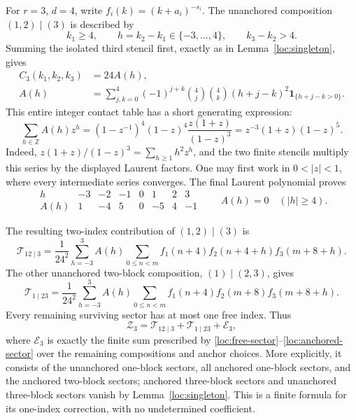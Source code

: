 \documentclass[11pt,a4paper]{article}
\numberwithin{equation}{section}
\theoremstyle{definition}
\theoremstyle{remark}
\newcommand{\Z}{\mathbb Z}
\newcommand{\ind}{\mathbf 1}
\begin{document}
For $r=3$, $d=4$, write $f_i(k)=(k+a_i)^{-s_i}$.  The unanchored
composition $(1,2)\mid(3)$ is described by
\[
 k_1\ge4,\qquad h=k_2-k_1\in\{-3,\ldots,4\},
 \qquad k_3-k_2>4.
\]
Summing the isolated third stencil first, exactly as in
Lemma~\ref{loc:singleton}, gives
\begin{align}
 C_3(k_1,k_2,k_3)&=24A(h),\label{loc:rank3-contact}\\
 A(h)&=\sum_{j,k=0}^4(-1)^{j+k}\binom4j\binom4k
                  (h+j-k)^2\ind_{\{h+j-k>0\}}.
                  \label{loc:rank3-A}
\end{align}
This entire integer contact table has a short generating expression:
\begin{equation}
 \sum_{h\in\Z}A(h)z^h
   =(1-z^{-1})^4(1-z)^4\frac{z(1+z)}{(1-z)^3}
   =z^{-3}(1+z)(1-z)^5.
 \label{loc:rank3-generating}
\end{equation}
Indeed, $z(1+z)/(1-z)^3=\sum_{h\ge1}h^2z^h$, and the two finite
stencils multiply this series by the displayed Laurent factors.
One may first work in $0<|z|<1$, where every intermediate series
converges.  The final Laurent polynomial proves
\[
\begin{array}{c|rrrrrrr}
 h&-3&-2&-1&0&1&2&3\\\hline
 A(h)&1&-4&5&0&-5&4&-1
\end{array}
\qquad A(h)=0\quad(|h|\ge4).
\]

The resulting two-index contribution of $(1,2)\mid(3)$ is
\begin{equation}
 \mathcal T_{12\mid3}
  =\frac1{24^2}\sum_{h=-3}^3 A(h)
       \sum_{0\le n<m}
       f_1(n+4)f_2(n+4+h)f_3(m+8+h).
 \label{loc:rank3-first}
\end{equation}
The other unanchored two-block composition, $(1)\mid(2,3)$, gives
\begin{equation}
 \mathcal T_{1\mid23}
  =\frac1{24^2}\sum_{h=-3}^3 A(h)
       \sum_{0\le n<m}
       f_1(n+4)f_2(m+8)f_3(m+8+h).
 \label{loc:rank3-second}
\end{equation}
Every remaining surviving sector has at most one free index.  Thus
\begin{equation}
 \mathcal Z_3=\mathcal T_{12\mid3}+\mathcal T_{1\mid23}
                         +\mathcal E_3,
 \label{loc:rank3-decomposition}
\end{equation}
where $\mathcal E_3$ is exactly the finite sum prescribed by
\eqref{loc:free-sector}--\eqref{loc:anchored-sector} over the remaining
compositions and anchor choices.  More explicitly, it consists of the
unanchored one-block sectors, all anchored one-block sectors, and the
anchored two-block sectors; anchored three-block sectors and
unanchored three-block sectors vanish by Lemma~\ref{loc:singleton}.
This is a finite formula for its one-index correction, with no
undetermined coefficient.
\end{document}
